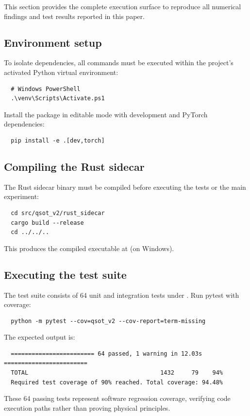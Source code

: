 
This section provides the complete execution surface to reproduce all numerical findings and test results reported in this paper.

\subsection{Environment setup}
To isolate dependencies, all commands must be executed within the project's activated Python virtual environment:
\begin{verbatim}
  # Windows PowerShell
  .\venv\Scripts\Activate.ps1
\end{verbatim}
Install the package in editable mode with development and PyTorch dependencies:
\begin{verbatim}
  pip install -e .[dev,torch]
\end{verbatim}

\subsection{Compiling the Rust sidecar}
The Rust sidecar binary must be compiled before executing the tests or the main experiment:
\begin{verbatim}
  cd src/qsot_v2/rust_sidecar
  cargo build --release
  cd ../../..
\end{verbatim}
This produces the compiled executable  at  (on Windows).

\subsection{Executing the test suite}
The test suite consists of 64 unit and integration tests under . Run pytest with coverage:
\begin{verbatim}
  python -m pytest --cov=qsot_v2 --cov-report=term-missing
\end{verbatim}
The expected output is:
\begin{verbatim}
  ======================== 64 passed, 1 warning in 12.03s ========================
  TOTAL                                      1432     79    94%
  Required test coverage of 90% reached. Total coverage: 94.48%
\end{verbatim}
These 64 passing tests represent software regression coverage, verifying code execution paths rather than proving physical principles.

